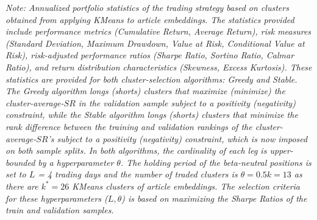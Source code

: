 \documentclass[12pt,article]{memoir}
\begin{document}
\begin{landscape}
\begin{table}[H]
\vspace{0.5cm}
\begin{minipage}{\textwidth}
\setlength{\parindent}{0pt}
\small\textit{Note: 
Annualized portfolio statistics of the trading strategy based on clusters obtained from applying KMeans to article embeddings. The statistics provided include performance metrics (Cumulative Return, Average Return), risk measures (Standard Deviation, Maximum Drawdown, Value at Risk, Conditional Value at Risk), risk-adjusted performance ratios (Sharpe Ratio, Sortino Ratio, Calmar Ratio), and return distribution characteristics (Skewness, Excess Kurtosis). These statistics are provided for both cluster-selection algorithms: Greedy and Stable. The Greedy algorithm longs (shorts) clusters that maximize (minimize) the cluster-average-$SR$ in the validation sample subject to a positivity (negativity) constraint, while the Stable algorithm longs (shorts) clusters that minimize the rank difference between the training and validation rankings of the cluster-average-$SR$'s subject to a positivity (negativity) constraint, which is now imposed on both sample splits. In both algorithms, the cardinality of each leg is upper-bounded by a hyperparameter $\theta$. 
The holding period of the beta-neutral positions is set to $L$ = 4 trading days and the number of traded clusters is $\theta = 0.5k=13$ as there are $k^*=26$ KMeans clusters of article embeddings. The selection criteria for these hyperparameters ($L,\theta$) is based on maximizing the Sharpe Ratios of the train and validation samples.
}
\end{minipage}

\end{table}

\end{landscape}

\end{document}
